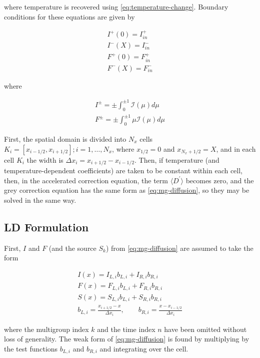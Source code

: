 \documentclass{template}
\newcommand{\I}{\mathcal{I}}
\begin{document}
where temperature is recovered using \autoref{eq:temperature-change}. Boundary conditions for these equations are given by

\begin{gather}
    I^+(0) = I_{in}^+\\
    I^-(X) = I_{in}^-\\
    F^+(0) = F_{in}^+\\
    F^-(X) = F_{in}^-
\end{gather}

where 

\begin{gather}
    I^\pm = \pm \int_0^{\pm 1} \I(\mu)d\mu   \\
    F^\pm = \pm \int_0^{\pm 1} \mu \I(\mu)d\mu  
\end{gather}

First, the spatial domain is divided into $N_x$ cells $K_i = [x_{i-1/2}, x_{i+1/2}]; i=1,\hdots,N_x$, where $x_{1/2} =0$ and $x_{N_x + 1/2} = X$, and in each cell $K_i$ the width is $\Delta x_i = x_{i+1/2} - x_{i-1/2}$. Then, if temperature (and temperature-dependent coefficients) are taken to be constant within each cell, then, in the accelerated correction equation, the term $\langle D^\prime \rangle$ becomes zero, and the grey correction equation has the same form as \autoref{eq:mg-diffusion}, so they may be solved in the same way.

\subsection{LD Formulation}

First, $I$ and $F$ (and the source $S_k$) from \autoref{eq:mg-diffusion} are assumed to take the form

\begin{subequations}\label{eq:assumed-forms}
    \begin{gather}
        I(x) = I_{L, i} b_{L, i} + I_{R, i} b_{R, i}\\
        F(x) = F_{L, i} b_{L, i} + F_{R, i} b_{R, i}\\
        S(x) = S_{L, i} b_{L, i} + S_{R, i} b_{R, i}\\
        b_{L, i} = \frac{x_{i+1/2} - x}{\Delta x_i}, \qquad b_{R, i} = \frac{x - x_{i-1/2}}{\Delta x_i}
    \end{gather}
\end{subequations}

where the multigroup index $k$ and the time index $n$ have been omitted without loss of generality. The weak form of \autoref{eq:mg-diffusion} is found by multiplying by the test functions $b_{L, i}$ and $b_{R, i}$ and integrating over the cell.
\end{document}
